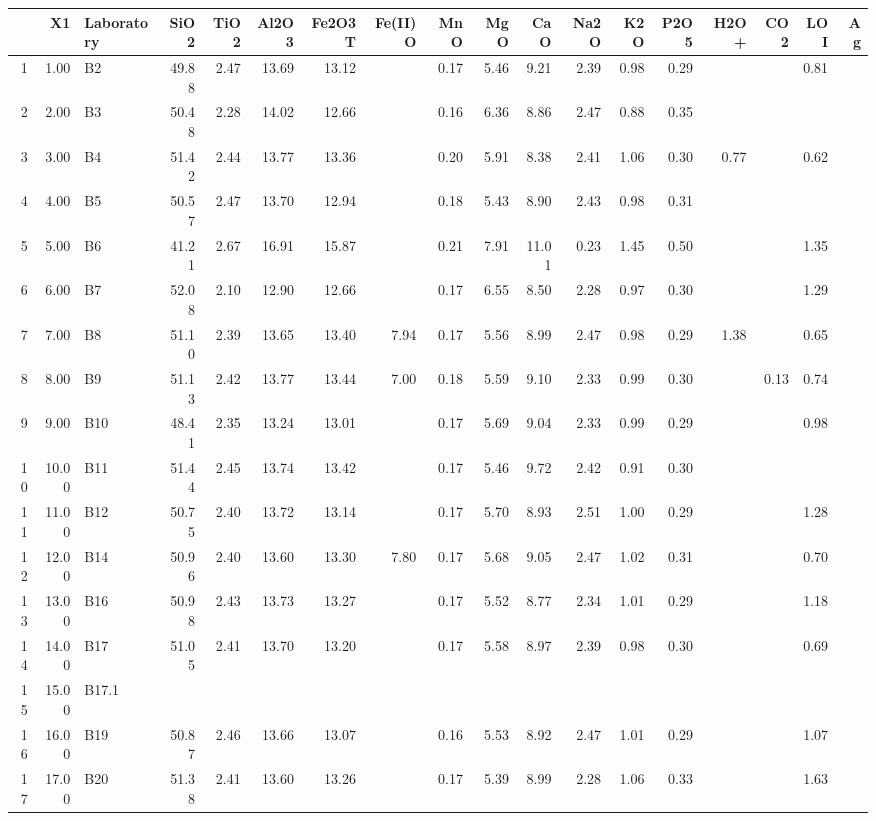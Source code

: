 \begin{table}[ht]
\centering
\begin{tabular}{rrlrrrrrrrrrrrrrrr}
  \hline
 & X1 & Laboratory & SiO2 & TiO2 & Al2O3 & Fe2O3T & Fe(II)O & MnO & MgO & CaO & Na2O & K2O & P2O5 & H2O+ & CO2 & LOI & Ag \\ 
  \hline
1 & 1.00 & B2 & 49.88 & 2.47 & 13.69 & 13.12 &  & 0.17 & 5.46 & 9.21 & 2.39 & 0.98 & 0.29 &  &  & 0.81 &  \\ 
  2 & 2.00 & B3 & 50.48 & 2.28 & 14.02 & 12.66 &  & 0.16 & 6.36 & 8.86 & 2.47 & 0.88 & 0.35 &  &  &  &  \\ 
  3 & 3.00 & B4 & 51.42 & 2.44 & 13.77 & 13.36 &  & 0.20 & 5.91 & 8.38 & 2.41 & 1.06 & 0.30 & 0.77 &  & 0.62 &  \\ 
  4 & 4.00 & B5 & 50.57 & 2.47 & 13.70 & 12.94 &  & 0.18 & 5.43 & 8.90 & 2.43 & 0.98 & 0.31 &  &  &  &  \\ 
  5 & 5.00 & B6 & 41.21 & 2.67 & 16.91 & 15.87 &  & 0.21 & 7.91 & 11.01 & 0.23 & 1.45 & 0.50 &  &  & 1.35 &  \\ 
  6 & 6.00 & B7 & 52.08 & 2.10 & 12.90 & 12.66 &  & 0.17 & 6.55 & 8.50 & 2.28 & 0.97 & 0.30 &  &  & 1.29 &  \\ 
  7 & 7.00 & B8 & 51.10 & 2.39 & 13.65 & 13.40 & 7.94 & 0.17 & 5.56 & 8.99 & 2.47 & 0.98 & 0.29 & 1.38 &  & 0.65 &  \\ 
  8 & 8.00 & B9 & 51.13 & 2.42 & 13.77 & 13.44 & 7.00 & 0.18 & 5.59 & 9.10 & 2.33 & 0.99 & 0.30 &  & 0.13 & 0.74 &  \\ 
  9 & 9.00 & B10 & 48.41 & 2.35 & 13.24 & 13.01 &  & 0.17 & 5.69 & 9.04 & 2.33 & 0.99 & 0.29 &  &  & 0.98 &  \\ 
  10 & 10.00 & B11 & 51.44 & 2.45 & 13.74 & 13.42 &  & 0.17 & 5.46 & 9.72 & 2.42 & 0.91 & 0.30 &  &  &  &  \\ 
  11 & 11.00 & B12 & 50.75 & 2.40 & 13.72 & 13.14 &  & 0.17 & 5.70 & 8.93 & 2.51 & 1.00 & 0.29 &  &  & 1.28 &  \\ 
  12 & 12.00 & B14 & 50.96 & 2.40 & 13.60 & 13.30 & 7.80 & 0.17 & 5.68 & 9.05 & 2.47 & 1.02 & 0.31 &  &  & 0.70 &  \\ 
  13 & 13.00 & B16 & 50.98 & 2.43 & 13.73 & 13.27 &  & 0.17 & 5.52 & 8.77 & 2.34 & 1.01 & 0.29 &  &  & 1.18 &  \\ 
  14 & 14.00 & B17 & 51.05 & 2.41 & 13.70 & 13.20 &  & 0.17 & 5.58 & 8.97 & 2.39 & 0.98 & 0.30 &  &  & 0.69 &  \\ 
  15 & 15.00 & B17.1 &  &  &  &  &  &  &  &  &  &  &  &  &  &  &  \\ 
  16 & 16.00 & B19 & 50.87 & 2.46 & 13.66 & 13.07 &  & 0.16 & 5.53 & 8.92 & 2.47 & 1.01 & 0.29 &  &  & 1.07 &  \\ 
  17 & 17.00 & B20 & 51.38 & 2.41 & 13.60 & 13.26 &  & 0.17 & 5.39 & 8.99 & 2.28 & 1.06 & 0.33 &  &  & 1.63 &  \\ 
   \hline
\end{tabular}
\end{table}
